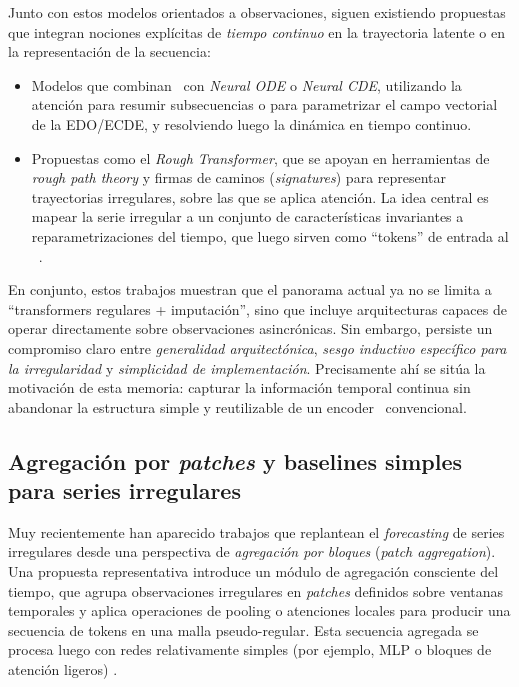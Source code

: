 Junto con estos modelos orientados a observaciones, siguen existiendo propuestas que integran nociones explícitas de \textit{tiempo continuo} en la trayectoria latente o en la representación de la secuencia:
\begin{itemize}
    \item Modelos que combinan \Transformers\ con \textit{Neural ODE} o \textit{Neural CDE}, utilizando la atención para resumir subsecuencias o para parametrizar el campo vectorial de la EDO/ECDE, y resolviendo luego la dinámica en tiempo continuo.
    \item Propuestas como el \textit{Rough Transformer}, que se apoyan en herramientas de \emph{rough path theory} y firmas de caminos (\emph{signatures}) para representar trayectorias irregulares, sobre las que se aplica atención. La idea central es mapear la serie irregular a un conjunto de características invariantes a reparametrizaciones del tiempo, que luego sirven como ``tokens'' de entrada al \Transformer\ \cite{moreno2024rough}.
\end{itemize}

En conjunto, estos trabajos muestran que el panorama actual ya no se limita a ``transformers regulares + imputación'', sino que incluye arquitecturas capaces de operar directamente sobre observaciones asincrónicas. Sin embargo, persiste un compromiso claro entre \textit{generalidad arquitectónica}, \textit{sesgo inductivo específico para la irregularidad} y \textit{simplicidad de implementación}. Precisamente ahí se sitúa la motivación de esta memoria: capturar la información temporal continua sin abandonar la estructura simple y reutilizable de un encoder \Transformer\ convencional.

\subsection{Agregación por \emph{patches} y baselines simples para series irregulares}

Muy recientemente han aparecido trabajos que replantean el \emph{forecasting} de series irregulares desde una perspectiva de \textit{agregación por bloques} (\emph{patch aggregation}). Una propuesta representativa introduce un módulo de agregación consciente del tiempo, que agrupa observaciones irregulares en \emph{patches} definidos sobre ventanas temporales y aplica operaciones de pooling o atenciones locales para producir una secuencia de tokens en una malla pseudo-regular. Esta secuencia agregada se procesa luego con redes relativamente simples (por ejemplo, MLP o bloques de atención ligeros) \cite{liu2025rethinking}.

